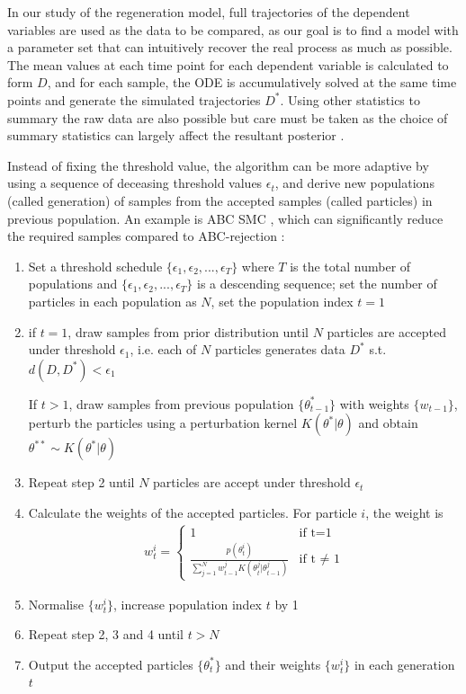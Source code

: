 In our study of the regeneration model, full trajectories of the dependent variables are used as the data to be compared, as our goal is to find a model with a parameter set that can intuitively recover the real process as much as possible. The mean values at each time point for each dependent variable is calculated to form $D$, and for each sample, the ODE is accumulatively solved at the same time points and generate the simulated trajectories $D^*$. Using other statistics to summary the raw data are also possible but care must be taken as the choice of summary statistics can largely affect the resultant posterior \cite{summaryD, summaryD2}.

Instead of fixing the threshold value, the algorithm can be more adaptive by using a sequence of deceasing threshold values $\epsilon_t$, and derive new populations (called generation) of samples from the accepted samples (called particles) in previous population. An example is ABC SMC \cite{Toni}, which can significantly reduce the required samples compared to ABC-rejection \cite{ref:disease}:

\begin{enumerate}
    \item Set a threshold schedule $\{\epsilon_1, \epsilon_2, ..., \epsilon_T\}$ where $T$ is the total number of populations and $\{\epsilon_1, \epsilon_2, ..., \epsilon_T\}$ is a descending sequence; set the number of particles in each population as $N$, set the population index $t=1$
    \item if $t=1$, draw samples from prior distribution until $N$ particles are accepted under threshold $\epsilon_1$, i.e. each of $N$ particles generates data $D^*$ s.t. $d(D,D^*)<\epsilon_1$
    
    If $t>1$, draw samples from previous population $\{\theta^*_{t-1}\}$ with weights $\{w_{t-1}\}$, perturb the particles using a perturbation kernel $K(\theta^*|\theta)$ and obtain $\theta^{**}\sim K(\theta^*|\theta)$
    \item Repeat step 2 until $N$ particles are accept under threshold $\epsilon_t$
    \item Calculate the weights of the accepted particles. For particle $i$, the weight is 
    \begin{align}
        \label{eq:weight}
        w^i_t =\begin{cases}
            1 & \text{if t=1} \\
            \frac{p(\theta^i_t)}{\sum_{j=1}^{N} w^j_{t-1}K(\theta^j_t|\theta^j_{t-1})} & \text{if t $\neq$ 1} 
        \end{cases}
    \end{align}
    
    \item Normalise $\{w^i_t\}$, increase population index $t$ by 1
    \item Repeat step 2, 3 and 4 until $t>N$
    \item Output the accepted particles $\{\theta^*_{t}\}$ and their weights $\{w^i_t\}$ in each generation $t$

\end{enumerate}

